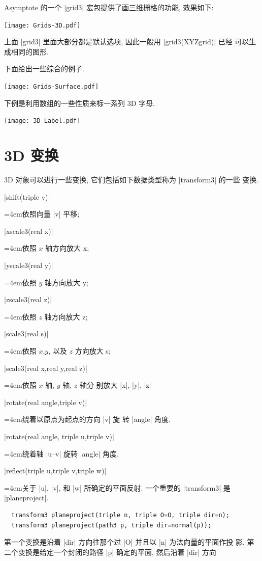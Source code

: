 \documentclass[nofonts,CJKnormalspaces]{ctexbook}[2009/05/20]
\newenvironment{funclist}{\trivlist
  \parindent=0pt
\item[]
  \def\item{\medskip\par\leftskip=0pt}
  \def\go{\par\leftskip=4em}}
{\endtrivlist}
\begin{document}
Asymptote 的一个 |grid3| 宏包提供了画三维栅格的功能, 效果如下:
\begin{center}\texttt{[image: Grids-3D.pdf]}\end{center}%

上面 |grid3| 里面大部分都是默认选项, 因此一般用 |grid3(XYZgrid)| 已经
可以生成相同的图形.

下面给出一些综合的例子.
\begin{center}\texttt{[image: Grids-Surface.pdf]}\end{center}%


下例是利用数组的一些性质来标一系列 3D 字母.
\begin{center}\texttt{[image: 3D-Label.pdf]}\end{center}%


\section{3D 变换}
3D 对象可以进行一些变换, 它们包括如下数据类型称为 |transform3| 的一些
变换.
\begin{funclist}
\item |shift(triple v)| \go 依照向量 |v| 平移;
\item |xscale3(real x)| \go 依照 $x$ 轴方向放大 x;
\item |yscale3(real y)| \go 依照 $y$ 轴方向放大 y;
\item |zscale3(real z)| \go 依照 $z$ 轴方向放大 z;
\item |scale3(real s)|   \go 依照 $x$,$y$, 以及 $z$ 方向放大 s;
\item |scale3(real x,real y,real z)| \go 依照 $x$ 轴, $y$ 轴, $z$ 轴分
  别放大 |x|, |y|, |z|
\item |rotate(real angle,triple v)| \go 绕着以原点为起点的方向 |v| 旋
  转 |angle| 角度.
\item |rotate(real angle, triple u,triple v)| \go 绕着轴 |u--v| 旋转
  |angle| 角度.
\item |reflect(triple u,triple v,triple w)| \go 关于 |u|, |v|, 和 |w|
  所确定的平面反射.
\end{funclist}
一个重要的 |transform3| 是 |planeproject|.
\begin{lstlisting}
  transform3 planeproject(triple n, triple O=O, triple dir=n);
  transform3 planeproject(path3 p, triple dir=normal(p));
\end{lstlisting}
第一个变换是沿着 |dir| 方向往那个过 |O| 并且以 |n| 为法向量的平面作投
影. 第二个变换是给定一个封闭的路径 |p| 确定的平面, 然后沿着 |dir| 方向
\end{document}
